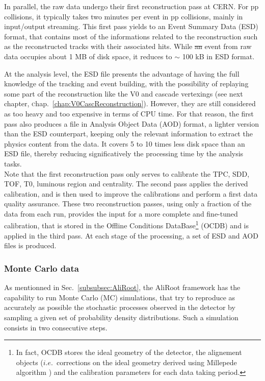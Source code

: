 \documentclass[ALICE,manyauthors]{cernphprep}
\newcommand{\ie}        {$i.e.$~}
\newcommand{\chap}      {\textsc{c}hap.~}
\newcommand{\Sec}       {\textsc{S}ec.~}
\providecommand{\DIFaddtex}[1]{{\protect\color{blue}\uwave{#1}}} %
\providecommand{\DIFdeltex}[1]{{\protect\color{red}\sout{#1}}}                      %
\providecommand{\DIFaddbegin}{} %
\providecommand{\DIFaddend}{} %
\providecommand{\DIFdelbegin}{} %
\providecommand{\DIFdelend}{} %
\providecommand{\DIFadd}[1]{\texorpdfstring{\DIFaddtex{#1}}{#1}} %
\providecommand{\DIFdel}[1]{\texorpdfstring{\DIFdeltex{#1}}{}} %
\newcommand{\DIFscaledelfig}{0.5}
\newlength{\DIFdelgraphicswidth} %
\newlength{\DIFdelgraphicsheight} %
\newcommand{\DIFaddincludegraphics}[2][]{{\color{blue}\fbox{\DIFOincludegraphics[#1]{#2}}}} %
\newcommand{\DIFdelincludegraphics}[2][]{%
\sbox{\DIFdelgraphicsbox}{\DIFOincludegraphics[#1]{#2}}%
\settoboxwidth{\DIFdelgraphicswidth}{\DIFdelgraphicsbox} %
\settoboxtotalheight{\DIFdelgraphicsheight}{\DIFdelgraphicsbox} %
\scalebox{\DIFscaledelfig}{%
\parbox[b]{\DIFdelgraphicswidth}{\usebox{\DIFdelgraphicsbox}\\[-\baselineskip] \rule{\DIFdelgraphicswidth}{0em}}\llap{\resizebox{\DIFdelgraphicswidth}{\DIFdelgraphicsheight}{%
\setlength{\unitlength}{\DIFdelgraphicswidth}%
\begin{picture}(1,1)%
\thicklines\linethickness{2pt} %
{\color[rgb]{1,0,0}\put(0,0){\framebox(1,1){}}}%
{\color[rgb]{1,0,0}\put(0,0){\line( 1,1){1}}}%
{\color[rgb]{1,0,0}\put(0,1){\line(1,-1){1}}}%
\end{picture}%
}\hspace*{3pt}}} %
} %
\DeclareRobustCommand{\DIFaddbegin}{\DIFOaddbegin \let\includegraphics\DIFaddincludegraphics} %
\DeclareRobustCommand{\DIFaddend}{\DIFOaddend \let\includegraphics\DIFOincludegraphics} %
\DeclareRobustCommand{\DIFdelbegin}{\DIFOdelbegin \let\includegraphics\DIFdelincludegraphics} %
\DeclareRobustCommand{\DIFdelend}{\DIFOaddend \let\includegraphics\DIFOincludegraphics} %
\begin{document}
In parallel, the raw data undergo their first reconstruction pass at CERN. For pp collisions, it typically takes two minutes per event in pp collisions, mainly in input/output streaming. This first pass yields to an Event Summary Data (ESD) format, that  contains most of the informations related to the reconstruction such as the reconstructed tracks with their associated hits. While \DIFdelbegin \DIFdel{an }\DIFdelend \DIFaddbegin \DIFadd{a pp }\DIFaddend event from raw data occupies about 1 MB of disk space, it reduces to $\sim$ 100 kB in ESD format. 

At the analysis level, the ESD file presents the advantage of having the full knowledge of the tracking and event building, with the possibility of replaying some part of the reconstruction like the V0 and cascade vertexings (see next chapter, \chap\ref{chap:V0CascReconstruction}). However, they are still considered as too heavy and too expensive in terms of CPU time. For that reason, the first pass also produces a file in Analysis Object Data (AOD) format, a lighter version than the ESD counterpart, keeping only the relevant information to extract the physics content from the data. It covers 5 to 10 times less disk space than an ESD file, thereby reducing significatively the processing time by the analysis tasks.\\

Note that the first reconstruction pass only serves to calibrate the TPC, SDD, TOF, T0, luminous region and centrality. The second pass applies the derived calibration, and is then used to improve the calibrations and perform a first data quality assurance. These two reconstruction passes, using only a fraction of the data from each run, provides the input for a more complete and fine-tuned calibration, that is stored in the Offline Conditions DataBase\footnote{In fact, OCDB stores the ideal geometry of the detector,  the alignement objects (\ie corrections on the ideal geometry derived using Millepede algorithm \cite{blobelNewMethodHighPrecision2002}) and the calibration parameters for each data taking period.} (OCDB) and is applied in the third pass. At each stage of the processing, a set of ESD and AOD files is produced. 

\subsubsection{Monte Carlo data}
\label{subsubsec:MCData}

As mentionned in \Sec\ref{subsubsec:AliRoot}, the AliRoot framework has the capability to run Monte Carlo (MC) simulations, that try to reproduce as accurately as possible the stochastic processes observed in the detector by sampling a given set of probability density distributions. Such a simulation consists in two consecutive steps.
\end{document}

